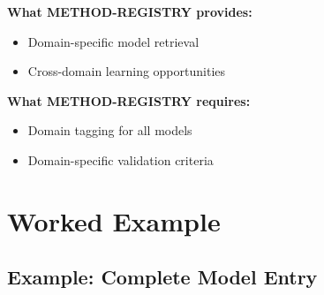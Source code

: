\begin{tcolorbox}[colback=yellow!5!white, colframe=yellow!75!black,
    title=Integration: METHOD-REGISTRY $\leftrightarrow$ DOMAIN Appendices]
\textbf{What METHOD-REGISTRY provides:}
\begin{itemize}[nosep]
\item Domain-specific model retrieval
\item Cross-domain learning opportunities
\end{itemize}

\textbf{What METHOD-REGISTRY requires:}
\begin{itemize}[nosep]
\item Domain tagging for all models
\item Domain-specific validation criteria
\end{itemize}
\end{tcolorbox}



\section{Worked Example}
\label{sec:fff-example}

\subsection{Example: Complete Model Entry}

